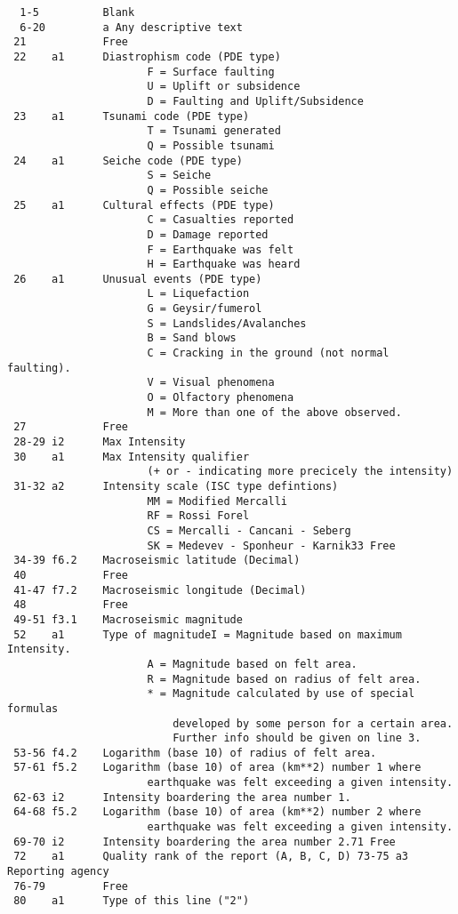 \begin{verbatim}
  1-5          Blank 
  6-20         a Any descriptive text
 21            Free 
 22    a1      Diastrophism code (PDE type)
                      F = Surface faulting 
                      U = Uplift or subsidence
                      D = Faulting and Uplift/Subsidence
 23    a1      Tsunami code (PDE type)
                      T = Tsunami generated 
                      Q = Possible tsunami 
 24    a1      Seiche code (PDE type)
                      S = Seiche 
                      Q = Possible seiche 
 25    a1      Cultural effects (PDE type)
                      C = Casualties reported 
                      D = Damage reported 
                      F = Earthquake was felt
                      H = Earthquake was heard
 26    a1      Unusual events (PDE type)
                      L = Liquefaction 
                      G = Geysir/fumerol 
                      S = Landslides/Avalanches 
                      B = Sand blows 
                      C = Cracking in the ground (not normal faulting).
                      V = Visual phenomena 
                      O = Olfactory phenomena
                      M = More than one of the above observed. 
 27            Free 
 28-29 i2      Max Intensity
 30    a1      Max Intensity qualifier
                      (+ or - indicating more precicely the intensity)
 31-32 a2      Intensity scale (ISC type defintions)
                      MM = Modified Mercalli    
                      RF = Rossi Forel 
                      CS = Mercalli - Cancani - Seberg
                      SK = Medevev - Sponheur - Karnik33 Free 
 34-39 f6.2    Macroseismic latitude (Decimal)
 40            Free 
 41-47 f7.2    Macroseismic longitude (Decimal)
 48            Free 
 49-51 f3.1    Macroseismic magnitude
 52    a1      Type of magnitudeI = Magnitude based on maximum Intensity.
                      A = Magnitude based on felt area.
                      R = Magnitude based on radius of felt area.
                      * = Magnitude calculated by use of special formulas
                          developed by some person for a certain area.
                          Further info should be given on line 3.
 53-56 f4.2    Logarithm (base 10) of radius of felt area.
 57-61 f5.2    Logarithm (base 10) of area (km**2) number 1 where
                      earthquake was felt exceeding a given intensity.
 62-63 i2      Intensity boardering the area number 1.
 64-68 f5.2    Logarithm (base 10) of area (km**2) number 2 where
                      earthquake was felt exceeding a given intensity.
 69-70 i2      Intensity boardering the area number 2.71 Free
 72    a1      Quality rank of the report (A, B, C, D) 73-75 a3 Reporting agency
 76-79         Free
 80    a1      Type of this line ("2") 


\end{verbatim}
